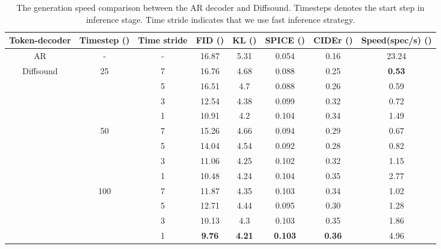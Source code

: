 \documentclass[lettersize,journal]{IEEEtran}
\begin{document}
\begin{table*}[t] \centering
\caption{The generation speed comparison between the AR decoder and Diffsound. Timesteps  denotes the start step in inference stage. Time stride  indicates that we use fast inference strategy.}
\label{tab:my-table3}
\begin{tabular}{cccccccc}
\hline
Token-decoder     & Timestep () & Time stride  & FID ()& KL ()     & SPICE ()  & CIDEr ()  & Speed(spec/s) () \\ \hline
AR                                               & -                    & -          & 16.87 & 5.31 & 0.054 & 0.16  & 23.24         \\ \hline
\multicolumn{1}{c|}{\multirow{12}{*}{Diffsound}} & \multirow{4}{*}{25}  & 7         & 16.76 & 4.68 & 0.088 & 0.25  & \textbf{0.53}          \\
\multicolumn{1}{c|}{}                            &                      & 5         & 16.51 & 4.7  & 0.088 & 0.26  & 0.59          \\
\multicolumn{1}{c|}{}                            &                      & 3         & 12.54 & 4.38 & 0.099 & 0.32  & 0.72          \\
\multicolumn{1}{c|}{}                            &                      & 1         & 10.91 & 4.2  & 0.104 & 0.34  & 1.49          \\ \cline{2-8} 
\multicolumn{1}{c|}{}                            & \multirow{4}{*}{50}  & 7         & 15.26 & 4.66 & 0.094 & 0.29  & 0.67          \\
\multicolumn{1}{c|}{}                            &                      & 5         & 14.04 & 4.54 & 0.092 & 0.28  & 0.82          \\
\multicolumn{1}{c|}{}                            &                      & 3         & 11.06 & 4.25 & 0.102 & 0.32  & 1.15          \\
\multicolumn{1}{c|}{}                            &                      & 1         & 10.48 & 4.24 & 0.104 & 0.35  & 2.77          \\ \cline{2-8} 
\multicolumn{1}{c|}{}                            & \multirow{4}{*}{100} & 7         & 11.87 & 4.35 & 0.103 & 0.34  & 1.02          \\
\multicolumn{1}{c|}{}                            &                      & 5         & 12.71 & 4.44 & 0.095 & 0.30  & 1.28          \\
\multicolumn{1}{c|}{}                            &                      & 3         & 10.13 & 4.3  & 0.103 & 0.35  & 1.86          \\
\multicolumn{1}{c|}{}                            &                      & 1         & \textbf{9.76}  & \textbf{4.21} & \textbf{0.103} & \textbf{0.36}  & 4.96          \\ \hline
\end{tabular}
\end{table*}
\end{document}
